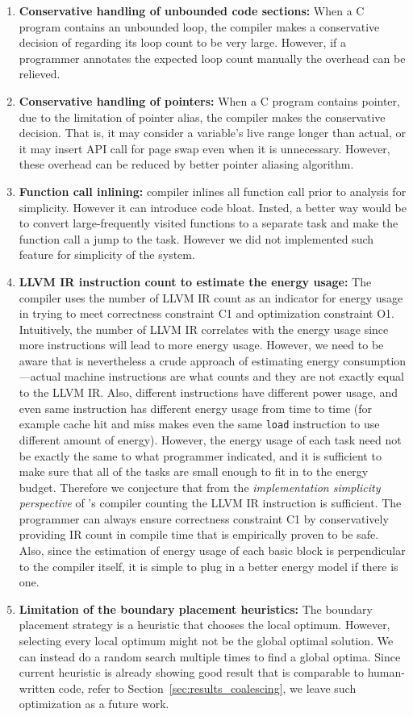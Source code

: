 \begin{enumerate}
	\item \textbf{Conservative handling of unbounded code sections:} When a C program contains an unbounded loop, the \sys compiler makes a conservative decision of regarding its loop count to be very large. However, if a programmer annotates the expected loop count manually the overhead can be relieved.
	\item \textbf{Conservative handling of pointers:} When a C program contains pointer, due to the limitation of pointer alias, the compiler makes the conservative decision. That is, it may consider a variable's live range longer than actual, or it may insert API call for page swap even when it is unnecessary. However, these overhead can be reduced by better pointer aliasing algorithm.
	\item \textbf{Function call inlining:} \sys compiler inlines all function call prior to analysis for simplicity. However it can introduce code bloat. Insted, a better way would be to convert large-frequently visited functions to a separate task and make the function call a jump to the task. However we did not implemented such feature for simplicity of the system.
	\item \textbf{LLVM IR instruction count to estimate the energy usage:} The compiler uses the number of LLVM IR count as an indicator for energy usage in trying to meet correctness constraint C1 and optimization constraint O1. Intuitively, the number of LLVM IR correlates with the energy usage since more instructions will lead to more energy usage. However, we need to be aware that is nevertheless a crude approach of estimating energy consumption---actual machine instructions are what counts and they are not exactly equal to the LLVM IR. Also, different instructions have different power usage, and even same instruction has different energy usage from time to time (for example cache hit and miss makes even the same {\tt load} instruction to use different amount of energy). However, the energy usage of each task need not be exactly the same to what programmer indicated, and it is sufficient to make sure that all of the tasks are small enough to fit in to the energy budget. Therefore we conjecture that from the \emph{implementation simplicity perspective} of \sys's compiler counting the LLVM IR instruction is sufficient. The programmer can always ensure correctness constraint C1 by conservatively providing IR count in compile time that is empirically proven to be safe. Also, since the estimation of energy usage of each basic block is perpendicular to the compiler itself, it is simple to plug in a better energy model if there is one.
	\item \textbf{Limitation of the boundary placement heuristics:} The boundary placement strategy is a heuristic that chooses the local optimum. However, selecting every local optimum might not be the global optimal solution. We can instead do a random search multiple times to find a global optima. Since current heuristic is already showing good result that is comparable to human-written code, refer to Section~\ref{sec:results_coalescing}, we leave such optimization as a future work.
\end{enumerate}